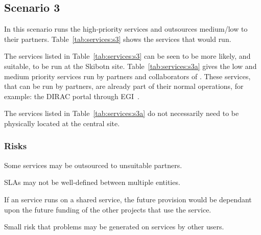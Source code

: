 \documentclass[12pt,a4paper]{article}
\newcommand{\nnt}{NeIC NT1\xspace}
\begin{document}

\subsection{Scenario 3}
\label{ssec:scen3}

In this scenario \EC runs the high-priority services and outsources medium/low to their partners.
Table~\ref{tab:services:s3} shows the services that \EC would run.

The services listed in Table~\ref{tab:services:s3} can be seen to be more likely, and suitable, to be run at the
Skibotn site.
Table~\ref{tab:services:s3a} gives the low and medium priority services run by partners and collaborators of \EC.
These services, that can be run by \EC partners, are already part of their normal operations, for example: the DIRAC portal through EGI~\cite{egi}.

The services listed in Table~\ref{tab:services:s3a} do not necessarily need to be physically located at the \ED central site. 
\subsubsection*{Risks}
\bitm
   \item {Some services may be outsourced to unsuitable partners.} %
   \item {SLAs may not be well-defined between multiple entities.}
   \item {If an \ED service runs on a shared service, the future provision would be dependant upon the future funding of the other projects that use the service.}
   \item {Small risk that problems may be generated on services by other users.}
\eitm
\end{document}
